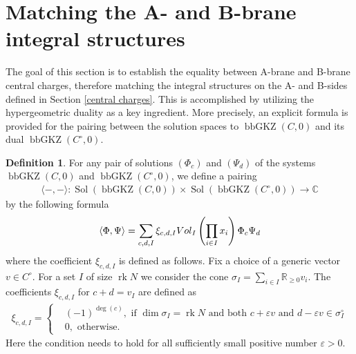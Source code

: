 \documentclass[11pt,reqno]{amsart}
\def\rk {{\operatorname{rk}}}
\def\CC {{\mathbb C}}
\def\R {{\mathbb R}}
\def\Vol {{\rm Vol}}
\theoremstyle{definition}
\newtheorem{definition}[theorem]{Definition}
\numberwithin{equation}{section}
\begin{document}
\section{Matching the A- and B-brane integral structures}\label{equality}

The goal of this section is to establish the equality between A-brane and B-brane central charges, therefore matching the integral structures on the A- and B-sides defined in Section \ref{central charges}. This is accomplished by utilizing the hypergeometric duality \cite{BHanDuality} as a key ingredient. More precisely, an explicit formula is provided for the pairing between the solution spaces to $\operatorname{bbGKZ}(C,0)$ and its dual $\operatorname{bbGKZ}(C^{\circ},0)$.


\smallskip

\begin{definition}
	For any pair of solutions $(\Phi_c)$ and $(\Psi_d)$ of the systems $\operatorname{bbGKZ}(C,0)$ and $\operatorname{bbGKZ}(C^{\circ},0)$, we define a pairing 
	\begin{align*}
		\langle-,-\rangle: \operatorname{Sol}(\operatorname{bbGKZ}(C,0))\times \operatorname{Sol}(\operatorname{bbGKZ}(C^{\circ},0))\rightarrow\CC
	\end{align*}
	by the following formula
	\begin{align*}
		\langle \Phi,\Psi\rangle = \sum_{c,d,I}\xi_{c,d,I}\Vol_I\left(\prod_{i\in I}x_i\right)\Phi_c\Psi_d
	\end{align*}
	where the coefficient $\xi_{c,d,I}$ is defined as follows. Fix a choice of a generic vector $v\in C^{\circ}$. For a set $I$ of size $\rk N$ we consider the cone
$\sigma_I=\sum_{i\in I} \R_{\geq 0} v_i$. The coefficients $\xi_{c,d,I}$ for $c+d = v_I$ are defined as
\begin{align*}
    \xi_{c,d,I}=\left\{
    \begin{array}{ll}
         & (-1)^{\operatorname{deg}(c)}, \text{ if } \dim\sigma_{I}=\operatorname{rk}N \text{ and both } c+\varepsilon v\text{ and }d-\varepsilon v\in\sigma_{I}^{\circ} \\
         & 0, \text{ otherwise}.
    \end{array}
    \right.
\end{align*}
Here the condition needs to hold for all sufficiently small positive number $\varepsilon>0$. 
\end{definition}
\end{document}
